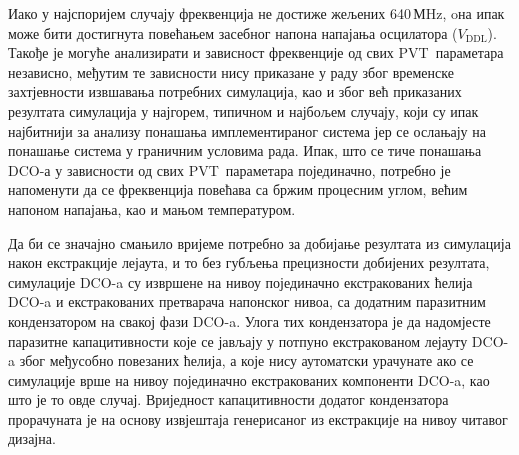 \documentclass[master]{finthesis}
\def \DCO  {DCO} %
\def \PVT  {PVT} %
\begin{document}
Иако у најспоријем случају фреквенција не достиже жељених 640\,МHz, oна ипак може бити достигнута повећањем засебног напона напајања осцилатора ($V_\text{DDL}$). Такође је могуће анализирати и зависност фреквенције од свих \PVT\ параметара независно, међутим те зависности нису приказане у раду због временске захтјевности извшавања потребних симулација, као и због већ приказаних резултата симулација у најгорем, типичном и најбољем случају, који су ипак најбитнији за анализу понашања имплементираног система јер се ослањају на понашање система у граничним условима рада. Ипак, што се тиче понашања \DCO-а у зависности од свих \PVT\ параметара појединачно, потребно је напоменути да се фреквенција повећава са бржим процесним углом, већим напоном напајања, као и мањом температуром. \par
Да би се значајно смањило вријеме потребно за добијање резултата из симулација након екстракције лејаута, и то без губљења прецизности добијених резултата, симулације \DCO-a су извршене на нивоу појединачно екстракованих ћелија \DCO-a и екстракованих претварача напонског нивоа, са додатним паразитним кондензатором на свакој фази \DCO-a. Улога тих кондензатора је да надомјесте паразитне капацитивности које се јављају у потпуно екстракованом лејауту \DCO-a због међусобно повезаних ћелија, а које нису аутоматски урачунате ако се симулације врше на нивоу појединачно екстракованих компоненти \DCO-a, као што је то овде случај. Вриједност капацитивности додатог кондензатора прорачуната је на основу извјештаја генерисаног из екстракције на нивоу читавог дизајна.  
\end{document}
